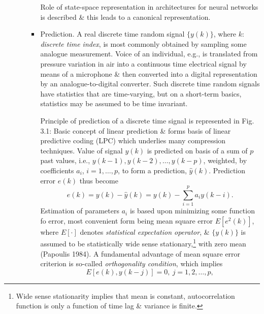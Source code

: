 \documentclass{article}
\begin{document}
\begin{enumerate}
\begin{itemize}
\begin{itemize}
			Role of state-space representation in architectures for neural networks is described \& this leads to a canonical representation.
			\item {\sf Prediction.} A real discrete time random signal $\{y(k)\}$, where $k$: {\it discrete time index}, is most commonly obtained by sampling some analogue measurement. Voice of an individual, e.g., is translated from pressure variation in air into a continuous time electrical signal by means of a microphone \& then converted into a digital representation by an analogue-to-digital converter. Such discrete time random signals have statistics that are time-varying, but on a short-term basics, statistics may be assumed to be time invariant.
			
			Principle of prediction of a discrete time signal is represented in {\sf Fig. 3.1: Basic concept of linear prediction} \& forms basis of linear predictive coding (LPC) which underlies many compression techniques. Value of signal $y(k)$ is predicted on basis of a sum of $p$ past values, i.e., $y(k - 1),y(k - 2),\ldots,y(k - p)$, weighted, by coefficients $a_i$, $i = 1,\ldots,p$, to form a prediction, $\hat{y}(k)$. Prediction error $e(k)$ thus become
			\begin{equation}
				e(k) = y(k) - \hat{y}(k) = y(k) - \sum_{i=1}^p a_iy(k - i).
			\end{equation}
			Estimation of parameters $a_i$ is based upon minimizing some function fo error, most convenient form being mean square error $E[e^2(k)]$, where $E[\cdot]$ denotes {\it statistical expectation operator}, \& $\{y(k)\}$ is assumed to be statistically wide sense stationary,\footnote{Wide sense stationarity implies that mean is constant, autocorrelation function is only a function of time lag \& variance is finite.} with zero mean (Papoulis 1984). A fundamental advantage of mean square error criterion is so-called {\it orthogonality condition}, which implies
			\begin{equation}
				\label{orthogonality condition of mean square error}
				E[e(k),y(k - j)] = 0,\ j = 1,2,\ldots,p,
			\end{equation}

\end{itemize}
\end{itemize}
\end{enumerate}
\end{document}
